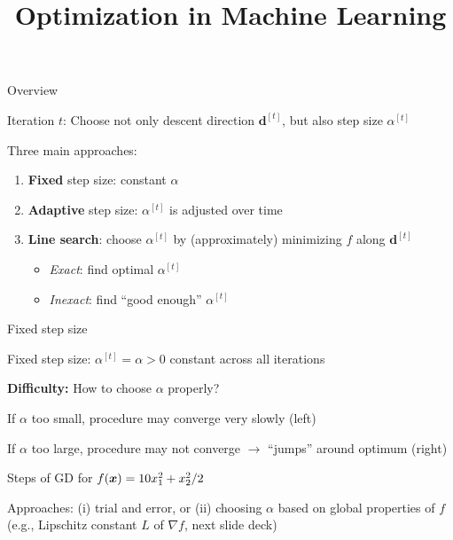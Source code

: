 \documentclass[11pt,compress,t,notes=noshow, xcolor=table]{beamer}
\title{Optimization in Machine Learning}
\begin{document}

\begin{framei}{Overview}
\item Iteration $t$: Choose not only descent direction $\mathbf{d}^{[t]}$, but also step size $\alpha^{[t]}$
\item Three main approaches:
\begin{enumerate}
\item \textbf{Fixed} step size: constant $\alpha$
\item \textbf{Adaptive} step size: $\alpha^{[t]}$ is adjusted over time
\item \textbf{Line search}: choose $\alpha^{[t]}$ by (approximately) minimizing $f$ along $\mathbf{d}^{[t]}$
\begin{itemize}
\item \textit{Exact}: find optimal $\alpha^{[t]}$
\item \textit{Inexact}: find ``good enough'' $\alpha^{[t]}$
\end{itemize}
\end{enumerate}
\end{framei}


\begin{framei}[fs=small]{Fixed step size}
\item Fixed step size: $\alpha^{[t]} = \alpha > 0$ constant across all iterations
\item \textbf{Difficulty:} How to choose $\alpha$ properly?
\begin{itemizeS}
\item If $\alpha$ too small, procedure may converge very slowly (left)
\item If $\alpha$ too large, procedure may not converge $\rightarrow$ \enquote{jumps} around optimum (right)
\end{itemizeS}
\begin{center}\begin{footnotesize}
Steps of GD for $f(\bm{x}) = 10 x_1^2 + x_2^2/2$
\end{footnotesize}\end{center}
\item Approaches: (i) trial and error, or (ii) choosing $\alpha$ based on global properties of $f$ (e.g., Lipschitz constant $L$ of $\nabla f$, next slide deck)
\end{framei}
\end{document}
